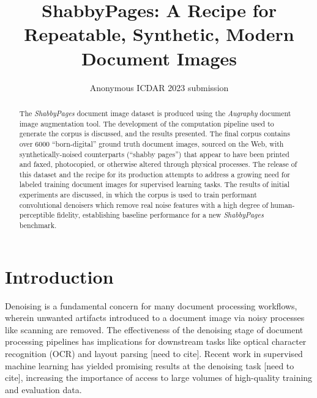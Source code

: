 \documentclass[runningheads]{llncs}
\begin{document}
\title{ShabbyPages: A Recipe for Repeatable, Synthetic, Modern Document Images}
%
%

\author{Anonymous ICDAR 2023 submission}


\maketitle

\begin{abstract}
The \emph{ShabbyPages} document image dataset is produced using the \emph{Augraphy} document image augmentation tool.
The development of the computation pipeline used to generate the corpus is discussed, and the results presented.
The final corpus contains over 6000 ``born-digital'' ground truth document images, sourced on the Web, with synthetically-noised counterparts (``shabby pages'') that appear to have been printed and faxed, photocopied, or otherwise altered through physical processes.
The release of this dataset and the recipe for its production attempts to address a growing need for labeled training document images for supervised learning tasks.
The results of initial experiments are discussed, in which the corpus is used to train performant convolutional denoisers which remove real noise features with a high degree of human-perceptible fidelity, establishing baseline performance for a new \emph{ShabbyPages} benchmark.
\end{abstract}

\section{Introduction}
Denoising is a fundamental concern for many document processing workflows, wherein unwanted artifacts introduced to a document image via noisy processes like scanning are removed.
The effectiveness of the denoising stage of document processing pipelines has implications for downstream tasks like optical character recognition (OCR) and layout parsing [need to cite].
Recent work in supervised machine learning has yielded promising results at the denoising task [need to cite], increasing the importance of access to large volumes of high-quality training and evaluation data.
\end{document}
